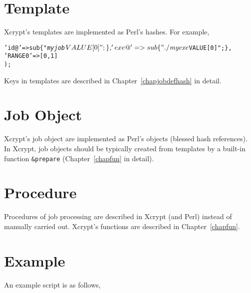 \documentclass[a4paper,10pt]{report}
\begin{document}
\section{Template}

Xcrypt's templates are implemented as Perl's hashes.  For example,
\begin{boxnote}
\begin{alltt}
%template = (
 'id@' => sub \{ "\textit{myjob}$VALUE[0]"; \},
 'exe@' => sub \{ "./\textit{myexe} $VALUE[0]"; \},
 'RANGE0' => [0,1]
);
\end{alltt}
\end{boxnote}
\vspace{\baselineskip}

Keys in templates are described in Chapter~\ref{chapjobdefhash} in
detail.

\section{Job Object}

Xcrypt's job object are implemented as Perl's objects (blessed hash
references).  In Xcrypt, job objects should be typically created from
templates by a built-in function \texttt{\&prepare}
(Chapter~\ref{chapfun} in detail).


\section{Procedure}

Procedures of job processing are described in Xcrypt (and Perl)
instead of manually carried out.
Xcrypt's functions are described in Chapter~\ref{chapfun}.

\section{Example}\label{secscriptexample}

An example script is as follows,
\end{document}

